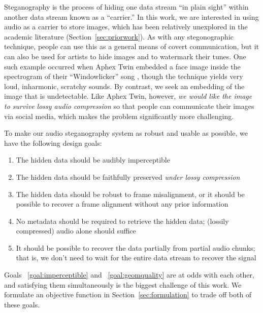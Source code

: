 \documentclass[runningheads]{llncs}
\begin{document}
Steganography is the process of hiding one data stream ``in plain sight'' within another data stream known as a ``carrier.''  In this work, we are interested in using audio as a carrier to store images, which has been relatively unexplored in the academic literature (Section~\ref{sec:priorwork}).  As with any stegonographic technique, people can use this as a general means of covert communication, but it can also be used for artists to hide images and to watermark their tunes.  One such example occurred when Aphex Twin embedded a face image inside the spectrogram of their ``Windowlicker'' song \cite{mathews2004music}, though the technique yields very loud, inharmonic, scratchy sounds.  By contrast, we seek an embedding of the image that is undetectable.  Like Aphex Twin, however, {\em we would like the image to survive lossy audio compression} so that people can communicate their images via social media, which makes the problem significantly more challenging.

To make our audio steganography system as robust and usable as possible, we have the following design goals:
\begin{enumerate}
    \item \label{goal:imperceptible} The hidden data should be audibly imperceptible
    \item \label{goal:geomquality} The hidden data should be faithfully preserved {\em under lossy compression}
    \item \label{goal:misalignment} The hidden data should be robust to frame misalignment, or it should be possible to recover a frame alignment without any prior information
    \item \label{goal:metadata} No metadata should be required to retrieve the hidden data; (lossily compressed) audio alone should suffice
    \item \label{goal:partial} It should be possible to recover the data partially from partial audio chunks; that is, we don't need to wait for the entire data stream to recover the signal
\end{enumerate}

Goals ~\ref{goal:imperceptible} and ~\ref{goal:geomquality} are at odds with each other, and satisfying them simultaneously is the biggest challenge of this work.  We formulate an objective function in Section~\ref{sec:formulation} to trade off both of these goals.
\end{document}
